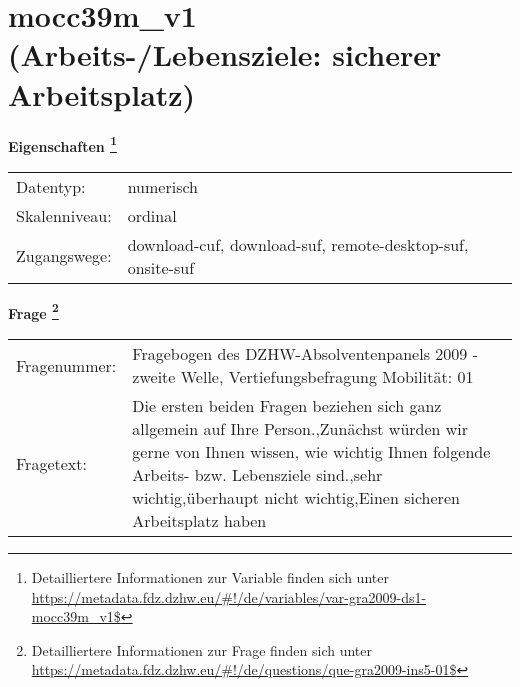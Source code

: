 
    \setcounter{footnote}{0}

    \vspace*{-1.8cm}
	\section{mocc39m\_v1 (Arbeits-/Lebensziele: sicherer Arbeitsplatz)}
	\label{section:mocc39m_v1}



    \vspace*{0.5cm}
    \noindent\textbf{Eigenschaften
	\footnote{Detailliertere Informationen zur Variable finden sich unter
		\url{https://metadata.fdz.dzhw.eu/\#!/de/variables/var-gra2009-ds1-mocc39m_v1$}}}\\
	\begin{tabularx}{\hsize}{@{}lX}
	Datentyp: & numerisch \\
	Skalenniveau: & ordinal \\
	Zugangswege: &
	  download-cuf, 
	  download-suf, 
	  remote-desktop-suf, 
	  onsite-suf
 \\
    \end{tabularx}



				\vspace*{0.5cm}
                \noindent\textbf{Frage
	                \footnote{Detailliertere Informationen zur Frage finden sich unter
		              \url{https://metadata.fdz.dzhw.eu/\#!/de/questions/que-gra2009-ins5-01$}}}\\
				\begin{tabularx}{\hsize}{@{}lX}
					Fragenummer: &
					  Fragebogen des DZHW-Absolventenpanels 2009 - zweite Welle, Vertiefungsbefragung Mobilität:
					  01
 \\
					Fragetext: & Die ersten beiden Fragen beziehen sich ganz allgemein auf Ihre Person.,Zunächst würden wir gerne von Ihnen wissen, wie wichtig Ihnen folgende Arbeits- bzw. Lebensziele sind.,sehr wichtig,überhaupt nicht wichtig,Einen sicheren Arbeitsplatz haben \\
				\end{tabularx}





